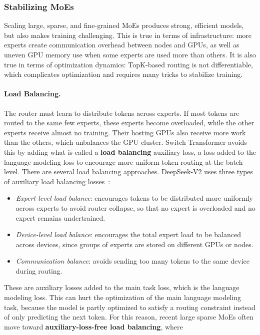 \subsubsection{Stabilizing MoEs}
Scaling large, sparse, and fine-grained MoEs produces strong, efficient models,
but also makes training challenging. This is true in terms of infrastructure:
more experts create communication overhead between nodes and GPUs, as well as
uneven GPU memory use when some experts are used more than others.
It is also true in terms of optimization dynamics: TopK-based routing
is not differentiable, which complicates optimization and requires
many tricks to stabilize training.

\paragraph{Load Balancing.} The router must learn to distribute tokens across experts.
If most tokens are routed to the same few experts, these experts become
overloaded, while the other experts receive almost no training. Their hosting GPUs
also receive more work than the others, which unbalances the GPU cluster.
Switch Transformer avoids this by adding what is called a \textbf{load balancing}
auxiliary loss, a loss added to the language modeling loss to encourage more
uniform token routing at the batch level. There are several load balancing
approaches. DeepSeek-V2 uses three types of auxiliary load balancing
losses~\citep{deepseekai2024deepseekv2}:
\begin{itemize}
    \item \textit{Expert-level load balance}: encourages tokens to be distributed
    more uniformly across experts to avoid router collapse, 
    so that no expert is overloaded and no expert remains undertrained.
    \item \textit{Device-level load balance}: encourages the total expert load to
    be balanced across devices, since groups of experts are stored on different
    GPUs or nodes.
    \item \textit{Communication balance}: avoids sending too many tokens to the same
    device during routing.
\end{itemize}
These are auxiliary losses added to the main task loss, which is the language
modeling loss. This can hurt the optimization of the main language modeling
task, because the model is partly optimized to satisfy a routing constraint
instead of only predicting the next token. For this reason, recent large sparse
MoEs often move toward \textbf{auxiliary-loss-free load balancing}, where
